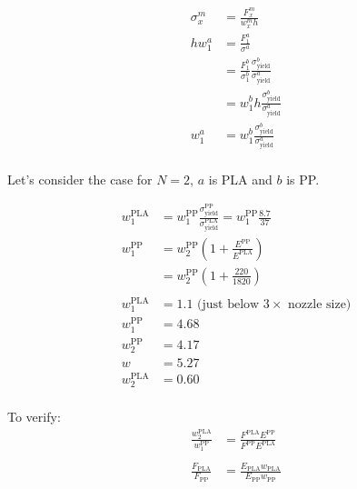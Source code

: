 \begin{align*}
	\sigma_x^m &= \frac{F_x^m}{w_x^m h}\\
	h w_1^a &= \frac{F_1^a}{\sigma^a} \\
	&= \frac{F_1^b}{\sigma_1^b} \frac{\sigma^b_\text{yield}}{\sigma^a_\text{yield}}\\
	&= w_1^b h \frac{\sigma^b_\text{yield}}{\sigma^a_\text{yield}}\\
	w_1^a &= w_1^b \frac{\sigma^b_\text{yield}}{\sigma^a_\text{yield}}\\
\end{align*}


Let's consider the case for $N=2$, $a$ is PLA and $b$ is PP.

\begin{align*}
	w_1^\text{PLA} &= w_1^\text{PP} \frac{\sigma^\text{PP}_\text{yield}}{\sigma^\text{PLA}_\text{yield}} = w_1^\text{PP} \frac{8.7}{37} \\
	w^\text{PP}_1 &=  w_2^\text{PP} \left( 1 + \frac{E^\text{PP}}{E^\text{PLA}}  \right) \\
	&=  w_2^\text{PP} \left( 1 + \frac{220}{1820}  \right) \\
	\\
	w_1^\text{PLA} &= 1.1 \text{ (just below $3\times$ nozzle size)}\\
	w_1^\text{PP} &= 4.68 \\
	w_2^\text{PP} &= 4.17 \\
	w &= 5.27 \\
	w_2^\text{PLA} &= 0.60 \\
\end{align*}

To verify:
\begin{align*}
	\frac{w_2^\text{PLA}}{w_1^\text{PP}} &= \frac{F^\text{PLA} E^\text{PP}}{F^\text{PP} E^\text{PLA}} \\
	\\
	\frac{F_\text{PLA}}{F_\text{PP}} &= \frac{E_\text{PLA} w_\text{PLA}}{E_\text{PP} w_\text{PP}} \\
\end{align*}

